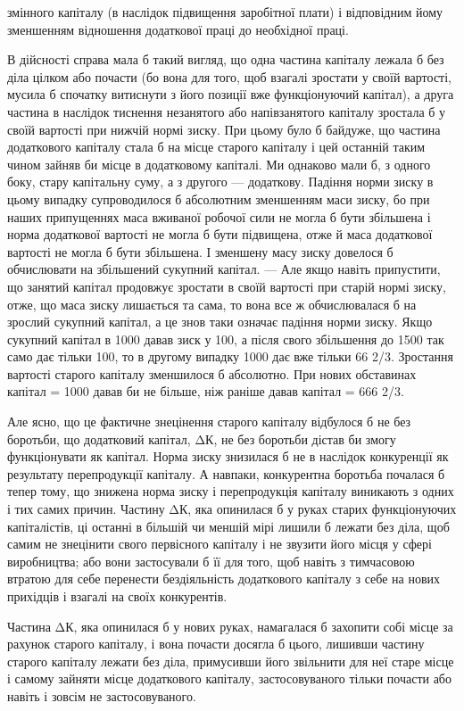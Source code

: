 \parcont{}  %
змінного капіталу (в наслідок підвищення заробітної плати) і відповідним
йому зменшенням відношення додаткової праці до
необхідної праці.

В дійсності справа мала б такий вигляд, що одна частина капіталу
лежала б без діла цілком або почасти (бо вона для того, щоб
взагалі зростати у своїй вартості, мусила б спочатку витиснути з
його позиції вже функціонуючий капітал), а друга частина в наслідок
тиснення незанятого або напівзанятого капіталу зростала б
у своїй вартості при нижчій нормі зиску. При цьому було б байдуже,
що частина додаткового капіталу стала б на місце старого капіталу
і цей останній таким чином зайняв би місце в додатковому
капіталі. Ми однаково мали б, з одного боку, стару капітальну
суму, а з другого — додаткову. Падіння норми зиску в цьому
випадку супроводилося б абсолютним зменшенням маси зиску, бо
при наших припущеннях маса вживаної робочої сили не могла б
бути збільшена і норма додаткової вартості не могла б бути підвищена,
отже й маса додаткової вартості не могла б бути збільшена.
І зменшену масу зиску довелося б обчислювати на збільшений
сукупний капітал. — Але якщо навіть припустити, що занятий
капітал продовжує зростати в своїй вартості при старій нормі
зиску, отже, що маса зиску лишається та сама, то вона все ж
обчислювалася б на зрослий сукупний капітал, а це знов таки
означає падіння норми зиску. Якщо сукупний капітал в 1000 давав
зиск у 100, а після свого збільшення до 1500 так само дає
тільки 100, то в другому випадку 1000 дає вже тільки 66 2/3. Зростання
вартості старого капіталу зменшилося б абсолютно. При
нових обставинах капітал = 1000 давав би не більше, ніж раніше
давав капітал = 666 2/3.

Але ясно, що це фактичне знецінення старого капіталу
відбулося б не без боротьби, що додатковий капітал, ΔК, не без
боротьби дістав би змогу функціонувати як капітал. Норма зиску
знизилася б не в наслідок конкуренції як результату перепродукції
капіталу. А навпаки, конкурентна боротьба почалася б тепер
тому, що знижена норма зиску і перепродукція капіталу виникають
з одних і тих самих причин. Частину ΔК, яка опинилася б
у руках старих функціонуючих капіталістів, ці останні в більшій
чи меншій мірі лишили б лежати без діла, щоб самим не знецінити
свого первісного капіталу і не звузити його місця у
сфері виробництва; або вони застосували б її для того, щоб навіть
з тимчасовою втратою для себе перенести бездіяльність
додаткового капіталу з себе на нових прихідців і взагалі на
своїх конкурентів.

Частина ΔК, яка опинилася б у нових руках, намагалася б
захопити собі місце за рахунок старого капіталу, і вона почасти
досягла б цього, лишивши частину старого капіталу лежати
без діла, примусивши його звільнити для неї старе місце і самому
зайняти місце додаткового капіталу, застосовуваного тільки
почасти або навіть і зовсім не застосовуваного.
